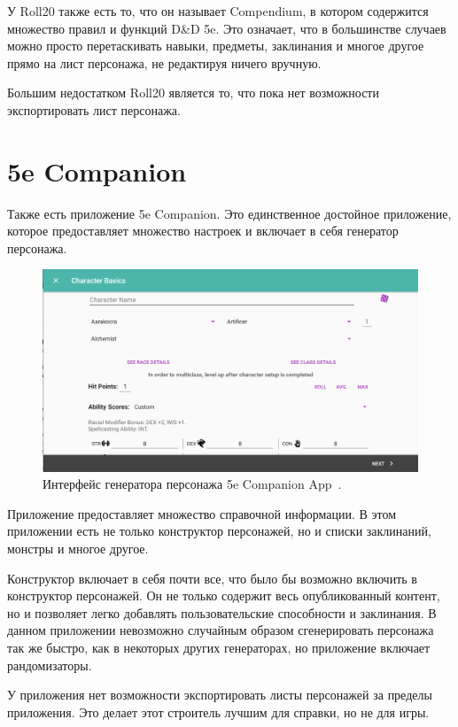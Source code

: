 У Roll20 также есть то, что он называет Compendium, в котором содержится множество правил и функций D\&D 5e. Это означает, что в большинстве случаев можно просто перетаскивать навыки, предметы, заклинания и многое другое прямо на лист персонажа, не редактируя ничего вручную.

Большим недостатком Roll20 является то, что пока нет возможности экспортировать лист персонажа.

\section{5e Companion}

Также есть приложение 5e Companion. Это единственное достойное приложение, которое предоставляет множество настроек и включает в себя генератор персонажа.

\begin{figure}[H]
    \centering
    \includegraphics[scale=0.4]{5e_Companion.png}
    \caption{Интерфейс генератора персонажа 5e Companion App~\cite{companion}.}
    \label{fig:5e_companion}
\end{figure}

Приложение предоставляет множество справочной информации. В этом приложении есть не только конструктор персонажей, но и списки заклинаний, монстры и многое другое. 

Конструктор включает в себя почти все, что было бы возможно включить в конструктор персонажей. Он не только содержит весь опубликованный контент, но и позволяет легко добавлять пользовательские способности и заклинания. В данном приложении невозможно случайным образом сгенерировать персонажа так же быстро, как в некоторых других генераторах, но приложение включает рандомизаторы.

У приложения нет возможности экспортировать листы персонажей за пределы приложения. Это делает этот строитель лучшим для справки, но не для игры. 

